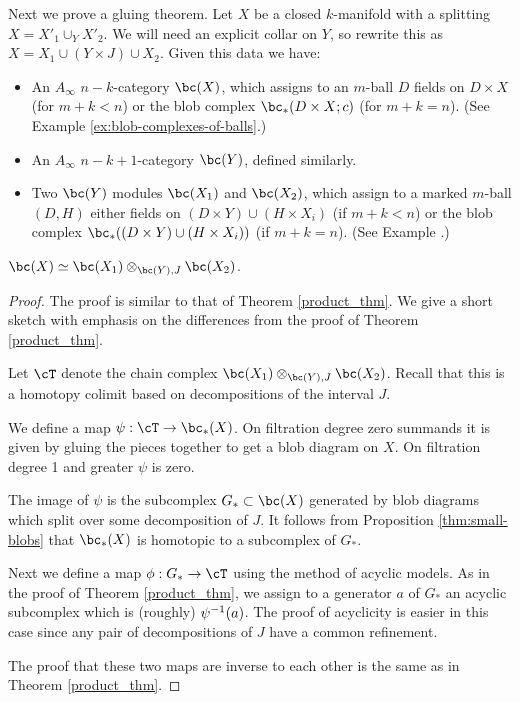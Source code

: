 Next we prove a gluing theorem.
Let $X$ be a closed $k$-manifold with a splitting $X = X'_1\cup_Y X'_2$.
We will need an explicit collar on $Y$, so rewrite this as
$X = X_1\cup (Y\times J) \cup X_2$.
Given this data we have:
\begin{itemize}
\item An $A_\infty$ $n{-}k$-category $\bc(X)$, which assigns to an $m$-ball
$D$ fields on $D\times X$ (for $m+k < n$) or the blob complex $\bc_*(D\times X; c)$
(for $m+k = n$).
(See Example \ref{ex:blob-complexes-of-balls}.)
\item An $A_\infty$ $n{-}k{+}1$-category $\bc(Y)$, defined similarly.
\item Two $\bc(Y)$ modules $\bc(X_1)$ and $\bc(X_2)$, which assign to a marked
$m$-ball $(D, H)$ either fields on $(D\times Y) \cup (H\times X_i)$ (if $m+k < n$)
or the blob complex $\bc_*((D\times Y) \cup (H\times X_i))$ (if $m+k = n$).
(See Example .)
\end{itemize}

\begin{thm}
\label{thm:gluing}
$\bc(X) \simeq \bc(X_1) \otimes_{\bc(Y), J} \bc(X_2)$.
\end{thm}

\begin{proof}
The proof is similar to that of Theorem \ref{product_thm}.
We give a short sketch with emphasis on the differences from 
the proof of Theorem \ref{product_thm}.

Let $\cT$ denote the chain complex $\bc(X_1) \otimes_{\bc(Y), J} \bc(X_2)$.
Recall that this is a homotopy colimit based on decompositions of the interval $J$.

We define a map $\psi:\cT\to \bc_*(X)$.
On filtration degree zero summands it is given
by gluing the pieces together to get a blob diagram on $X$.
On filtration degree 1 and greater $\psi$ is zero.

The image of $\psi$ is the subcomplex $G_*\sub \bc(X)$ generated by blob diagrams which split
over some decomposition of $J$.
It follows from Proposition \ref{thm:small-blobs} that $\bc_*(X)$ is homotopic to 
a subcomplex of $G_*$. 

Next we define a map $\phi:G_*\to \cT$ using the method of acyclic models.
As in the proof of Theorem \ref{product_thm}, we assign to a generator $a$ of $G_*$
an acyclic subcomplex which is (roughly) $\psi^{-1}(a)$.
The proof of acyclicity is easier in this case since any pair of decompositions of $J$ have
a common refinement.

The proof that these two maps are inverse to each other is the same as in
Theorem \ref{product_thm}.
\end{proof}

